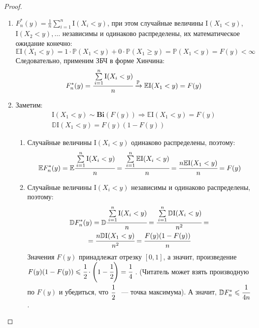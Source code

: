 \begin{proof}\leavevmode
\begin{enumerate}
    \item $F_{n}^{*}(y)=\frac{1}{n} \sum\limits_{i=1}^{n} \mathrm{I}(X_{i}<y)$, при этом случайные величины $\mathrm{I}(X_{1}<y)$, $\mathrm{I}(X_{2}<y), \ldots$ независимы и одинаково распределены, их математическое ожидание конечно:
    \begin{equation*}
        \mathbb{E}\mathrm{I}(X_{1}<y)=1 \cdot \mathbb{P}(X_{1}<y)+0 \cdot \mathbb{P}(X_{1} \geqslant y)=\mathbb{P}(X_{1}<y)=F(y)<\infty
    \end{equation*}
    Следовательно, применим ЗБЧ в форме Хинчина:
    \begin{equation*}
        F_{n}^{*}(y)=\cfrac{\sum\limits_{i=1}^{n} \mathrm{I}(X_{i}<y)}{n} \xrightarrow[]{\mathbb{P}} \mathbb{E}\mathrm{I}(X_{1}<y)=F(y) 
    \end{equation*}
    \item Заметим:
    \begin{gather*}
        \mathrm{I}(X_{1}<y) \sim  \mathbf{Bi}(F(y)) \Rightarrow \mathbb{E}\mathrm{I}(X_{1}<y) = F(y) \\
        \mathbb{D}\mathrm{I}(X_{1}<y) = F(y)(1-F(y))
    \end{gather*}
    \begin{enumerate}[label={\arabic*)}]
        \item Случайные величины $\mathrm{I}(X_{i}<y)$ одинаково распределены, поэтому:
        \begin{equation*}
            \mathbb{E} F_{n}^{*}(y)=\mathbb{E} \cfrac{\sum\limits_{i=1}^{n} \mathrm{I}(X_{i}<y)}{n}=\cfrac{\sum\limits_{i=1}^{n} \mathbb{E}\mathrm{I}(X_{i}<y)}{n}=\cfrac{n \mathbb{E}\mathrm{I}(X_{1}<y)}{n}=F(y)  
        \end{equation*}
        
        \item Случайные величины $\mathrm{I}(X_{i}<y)$ независимы и одинаково распределены, поэтому:
        \begin{multline*}
            \mathbb{D}F_{n}^{*}(y)
            = \mathbb{D} \cfrac{\sum\limits_{i=1}^{n} \mathrm{I}(X_{i}<y)}{n}
            = \cfrac{\sum\limits_{i=1}^{n} \mathbb{D}\mathrm{I}(X_{i}<y)}{n^{2}}
            = \\
            = \cfrac{n\mathbb{D}\mathrm{I}(X_{1}<y)}{n^{2}}
            = \cfrac{F(y)(1-F(y))}{n}
        \end{multline*}
        Значения $F(y)$ принадлежат отрезку $[0, 1]$, а значит, произведение $F(y)(1 - F(y)) \leqslant \cfrac{1}{2}\cdot\left(1 - \cfrac{1}{2}\right) = \cfrac{1}{4}~$. (Читатель может взять производную по $F(y)$ и убедиться, что $\cfrac{1}{2}$ ~--- точка максимума). А значит, $\mathbb{D}F_{n}^{*} \leqslant \cfrac{1}{4n}$. 
        

\end{enumerate}
\end{enumerate}
\end{proof}
